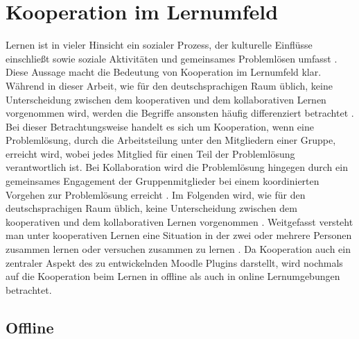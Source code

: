 \section{Kooperation im Lernumfeld}
\glqq Lernen ist in vieler Hinsicht ein sozialer Prozess, der kulturelle Einflüsse einschließt sowie soziale Aktivitäten und gemeinsames Problemlösen umfasst\grqq{} \citep{reinmann1995kooperation}. Diese Aussage macht die Bedeutung von Kooperation im Lernumfeld klar. 
Während in dieser Arbeit, wie für den deutschsprachigen Raum üblich, keine Unterscheidung zwischen dem kooperativen und dem kollaborativen Lernen vorgenommen wird, werden die Begriffe ansonsten häufig differenziert betrachtet \citep{reinmann2002analyse}. Bei dieser Betrachtungsweise handelt es sich um Kooperation, wenn eine Problemlösung, durch die Arbeitsteilung unter den Mitgliedern einer Gruppe, erreicht wird, wobei jedes Mitglied für einen Teil der Problemlösung verantwortlich ist.
Bei Kollaboration wird die Problemlösung hingegen durch ein gemeinsames Engagement der Gruppenmitglieder bei einem koordinierten Vorgehen zur Problemlösung erreicht \citep{dillenbourg1995evolution}.
Im Folgenden wird, wie für den deutschsprachigen Raum üblich, keine Unterscheidung zwischen dem kooperativen und dem kollaborativen Lernen vorgenommen \citep{reinmann2002analyse}. Weitgefasst versteht man unter kooperativen Lernen eine Situation in der zwei oder mehrere Personen zusammen lernen oder versuchen zusammen zu lernen \citep{dillenbourg1999collaborative}. Da Kooperation auch ein zentraler Aspekt des zu entwickelnden Moodle Plugins darstellt, wird nochmals auf die Kooperation beim Lernen in offline als auch in online Lernumgebungen betrachtet.





\subsection{Offline}
\citep{reinmann1995kooperation}
\citep{reinmann2002analyse}
\citep{pauli2000rolle}

